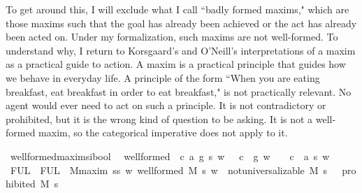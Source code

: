 \begin{isabellebody}
\begin{isamarkuptext}
To get around this, I will exclude what I call ``badly formed maxims," which are those maxims such that the goal has already been 
achieved or the act has already been acted on. Under my formalization, such maxims are 
not well-formed. To understand why, I return to Korsgaard's and O'Neill's interpretations of a maxim as a practical
guide to action. A maxim is a practical principle that guides how we behave in everyday life. A 
principle of the form ``When you are eating breakfast, eat breakfast in order to eat breakfast," is not 
practically relevant. No agent would ever need to act on such a principle. It is not contradictory
or prohibited, but it is the wrong kind of question to be asking. It is not a 
well-formed maxim, so the categorical imperative does not apply to it.%
\end{isamarkuptext}\isamarkuptrue%
\isamarkupfalse%
\ well{\isacharunderscore}formed{\isacharcolon}{\isacharcolon}{\isachardoublequoteopen}maxim{\isasymRightarrow}s{\isasymRightarrow}i{\isasymRightarrow}bool{\isachardoublequoteclose}\ \ \isanewline
{\isachardoublequoteopen}well{\isacharunderscore}formed\ {\isasymequiv}\ {\isasymlambda}{\isacharparenleft}c{\isacharcomma}\ a{\isacharcomma}\ g{\isacharparenright}\ s\ w{\isachardot}\ {\isacharparenleft}{\isasymnot}\ {\isacharparenleft}\ {\isacharparenleft}c\ \isactrlbold {\isasymrightarrow}\ g{\isacharparenright}\ w{\isacharparenright}{\isacharparenright}\ {\isasymand}\ {\isacharparenleft}{\isasymnot}\ {\isacharparenleft}\ {\isacharparenleft}c\ \isactrlbold {\isasymrightarrow}\ a\ s{\isacharparenright}\ w{\isacharparenright}{\isacharparenright}{\isachardoublequoteclose}\isanewline
%
\isanewline
\isanewline
{}\isamarkupfalse%
\ FUL\ \ {\isachardoublequoteopen}FUL\ {\isasymequiv}\ {\isasymforall}M{\isacharcolon}{\isacharcolon}maxim{\isachardot}\ {\isasymforall}s{\isacharcolon}{\isacharcolon}s{\isachardot}\ {\isacharparenleft}{\isasymforall}w{\isachardot}\ well{\isacharunderscore}formed\ M\ s\ w{\isacharparenright}\ {\isasymlongrightarrow}\ {\isacharparenleft}not{\isacharunderscore}universalizable\ M\ s\ {\isasymlongrightarrow}\ {\isasymTurnstile}\ prohibited\ M\ s\ {\isacharparenright}{\isachardoublequoteclose}\isanewline
%
\end{isabellebody}
